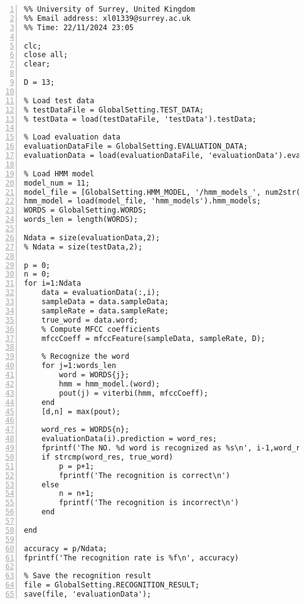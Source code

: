\documentclass{article}
\begin{document}
\begin{lstlisting}[frame=single, numbers=left, style=Matlab-editor, caption={test\_model.m}, label={lst:test_model}]
  %% Author: Xiaoguang Liang (PG/T - Comp Sci & Elec Eng)
%% University of Surrey, United Kingdom
%% Email address: xl01339@surrey.ac.uk
%% Time: 22/11/2024 23:05

clc;
close all;
clear;

D = 13;

% Load test data
% testDataFile = GlobalSetting.TEST_DATA;
% testData = load(testDataFile, 'testData').testData;

% Load evaluation data
evaluationDataFile = GlobalSetting.EVALUATION_DATA;
evaluationData = load(evaluationDataFile, 'evaluationData').evaluationData;

% Load HMM model
model_num = 11;
model_file = [GlobalSetting.HMM_MODEL, '/hmm_models_', num2str(model_num), '.mat'];
hmm_model = load(model_file, 'hmm_models').hmm_models;
WORDS = GlobalSetting.WORDS;
words_len = length(WORDS);

Ndata = size(evaluationData,2);
% Ndata = size(testData,2);

p = 0;
n = 0;
for i=1:Ndata
    data = evaluationData(:,i);
    sampleData = data.sampleData;
    sampleRate = data.sampleRate;
    true_word = data.word;
    % Compute MFCC coefficients
    mfccCoeff = mfccFeature(sampleData, sampleRate, D);

    % Recognize the word
    for j=1:words_len
        word = WORDS{j};
        hmm = hmm_model.(word);
        pout(j) = viterbi(hmm, mfccCoeff);
    end
    [d,n] = max(pout);

    word_res = WORDS{n};
    evaluationData(i).prediction = word_res;
    fprintf('The NO. %d word is recognized as %s\n', i-1,word_res)
    if strcmp(word_res, true_word)
        p = p+1;
        fprintf('The recognition is correct\n')
    else
        n = n+1;
        fprintf('The recognition is incorrect\n')
    end

end

accuracy = p/Ndata;
fprintf('The recognition rate is %f\n', accuracy)

% Save the recognition result
file = GlobalSetting.RECOGNITION_RESULT;
save(file, 'evaluationData');

\end{lstlisting}
\end{document}
